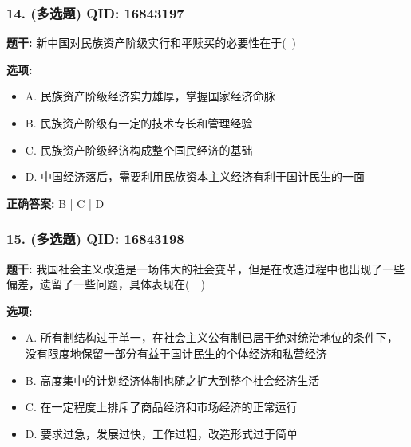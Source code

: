 \documentclass[12pt,UTF8]{ctexart}
\begin{document}
\subsubsection*{14. (多选题) \small QID: 16843197}

\textbf{题干:}
新中国对民族资产阶级实行和平赎买的必要性在于( )

\textbf{选项:}
\begin{itemize}[leftmargin=*]

  \item A. 民族资产阶级经济实力雄厚，掌握国家经济命脉

  \item B. 民族资产阶级有一定的技术专长和管理经验

  \item C. 民族资产阶级经济构成整个国民经济的基础

  \item D. 中国经济落后，需要利用民族资本主义经济有利于国计民生的一面

\end{itemize}

\textbf{正确答案:}
B | C | D

\vspace{0.3em}\hrulefill\vspace{0.7em}

\subsubsection*{15. (多选题) \small QID: 16843198}

\textbf{题干:}
我国社会主义改造是一场伟大的社会变革，但是在改造过程中也出现了一些偏差，遗留了一些问题，具体表现在(  )

\textbf{选项:}
\begin{itemize}[leftmargin=*]

  \item A. 所有制结构过于单一，在社会主义公有制已居于绝对统治地位的条件下，没有限度地保留一部分有益于国计民生的个体经济和私营经济

  \item B. 高度集中的计划经济体制也随之扩大到整个社会经济生活

  \item C. 在一定程度上排斥了商品经济和市场经济的正常运行

  \item D. 要求过急，发展过快，工作过粗，改造形式过于简单

\end{itemize}
\end{document}
